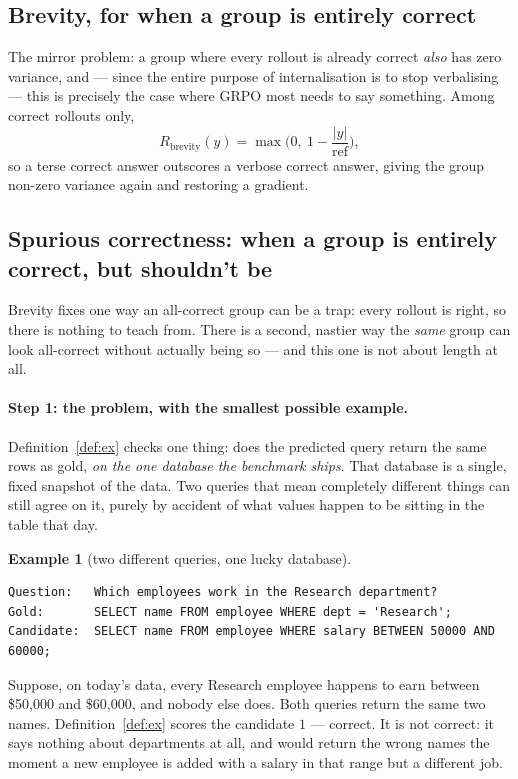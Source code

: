 \documentclass[11pt]{article}
\theoremstyle{definition}
\newtheorem{example}[theorem]{Example}
\begin{document}
\subsection{Brevity, for when a group is entirely correct}

The mirror problem: a group where every rollout is already correct \emph{also} has zero variance, and — since the entire purpose of internalisation is to stop verbalising — this is precisely the case where GRPO most needs to say something. Among correct rollouts only,
\[
R_{\mathrm{brevity}}(y) = \max\!\Big(0,\ 1 - \frac{|y|}{\text{ref}}\Big),
\]
so a terse correct answer outscores a verbose correct answer, giving the group non-zero variance again and restoring a gradient.

\subsection{Spurious correctness: when a group is entirely correct, but shouldn't be}
\label{sec:spurious}

Brevity fixes one way an all-correct group can be a trap: every rollout is right, so there is nothing to teach from. There is a second, nastier way the \emph{same} group can look all-correct without actually being so --- and this one is not about length at all.

\paragraph{Step 1: the problem, with the smallest possible example.} Definition~\ref{def:ex} checks one thing: does the predicted query return the same rows as gold, \emph{on the one database the benchmark ships}. That database is a single, fixed snapshot of the data. Two queries that mean completely different things can still agree on it, purely by accident of what values happen to be sitting in the table that day.

\begin{example}[two different queries, one lucky database]
\label{ex:spurious}
\leavevmode\par\noindent
\begin{lstlisting}
Question:   Which employees work in the Research department?
Gold:       SELECT name FROM employee WHERE dept = 'Research';
Candidate:  SELECT name FROM employee WHERE salary BETWEEN 50000 AND 60000;
\end{lstlisting}
Suppose, on today's data, every Research employee happens to earn between \$50{,}000 and \$60{,}000, and nobody else does. Both queries return the same two names. Definition~\ref{def:ex} scores the candidate $1$ --- correct. It is not correct: it says nothing about departments at all, and would return the wrong names the moment a new employee is added with a salary in that range but a different job.
\end{example}
\end{document}
